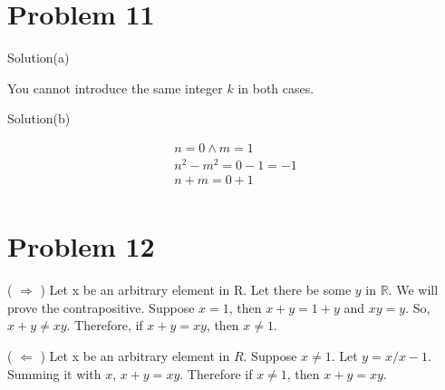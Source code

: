 \documentclass{article}
\begin{document}
\section{Problem 11}

Solution(a)

You cannot introduce the same integer $k$ in both cases.

Solution(b)

\begin{align*}
  n = 0 \land m = 1 \\
  n^2 - m^2 = 0 - 1 = -1 \\
  n + m = 0 + 1 \\
\end{align*}

\section{Problem 12}

( $\Rightarrow$ ) Let x be an arbitrary element in R. Let there be
some $y$ in $\mathbb{R}$. We will prove the contrapositive. Suppose $x
= 1$, then $x + y = 1 + y$ and $xy = y$. So, $x + y \neq xy$.
Therefore, if $x + y = xy$, then $x \neq 1$.

( $\Leftarrow$ ) Let x be an arbitrary element in $R$. Suppose $x \neq
1$. Let $y = x / x - 1$. Summing it with $x$, $x+y = xy$. Therefore if
$ x \neq 1$, then $x + y = xy$.
\end{document}

